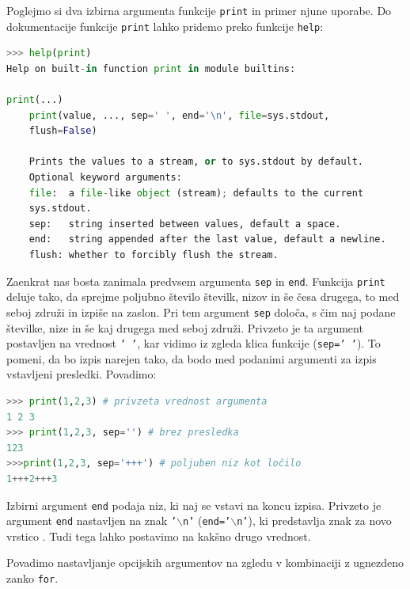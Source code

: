 Poglejmo si dva izbirna argumenta funkcije \texttt{print} in primer njune uporabe. Do dokumentacije funkcije \texttt{print} lahko pridemo preko funkcije \texttt{help}:
\begin{lstlisting}[language=Python]
>>> help(print)
Help on built-in function print in module builtins:

print(...)
    print(value, ..., sep=' ', end='\n', file=sys.stdout, 
    flush=False)
    
    Prints the values to a stream, or to sys.stdout by default.
    Optional keyword arguments:
    file:  a file-like object (stream); defaults to the current 
    sys.stdout.
    sep:   string inserted between values, default a space.
    end:   string appended after the last value, default a newline.
    flush: whether to forcibly flush the stream.
\end{lstlisting}
Zaenkrat nas bosta zanimala predvsem argumenta \texttt{sep} in \texttt{end}. Funkcija \texttt{print} deluje tako, da sprejme poljubno število številk, nizov in še česa drugega, to med seboj združi in izpiše na zaslon. Pri tem argument \texttt{sep} določa, s čim naj podane številke, nize in še kaj drugega med seboj združi. Privzeto je ta argument postavljen na vrednost \texttt{' '}, kar vidimo iz zgleda klica funkcije (\texttt{sep=' '}). To pomeni, da bo izpis narejen tako, da bodo med podanimi argumenti za izpis vstavljeni presledki. Povadimo:
\begin{lstlisting}[language=Python]
>>> print(1,2,3) # privzeta vrednost argumenta
1 2 3
>>> print(1,2,3, sep='') # brez presledka
123
>>>print(1,2,3, sep='+++') # poljuben niz kot ločilo
1+++2+++3
\end{lstlisting}
Izbirni argument \texttt{end} podaja niz, ki naj se vstavi na koncu izpisa. Privzeto je argument \texttt{end} nastavljen na znak \texttt{'$\backslash$n'} (\texttt{end='$\backslash$n'}), ki predstavlja znak za novo vrstico . Tudi tega lahko postavimo na kakšno drugo vrednost. 

Povadimo nastavljanje opcijskih argumentov na zgledu v kombinaciji z ugnezdeno zanko \texttt{for}.

